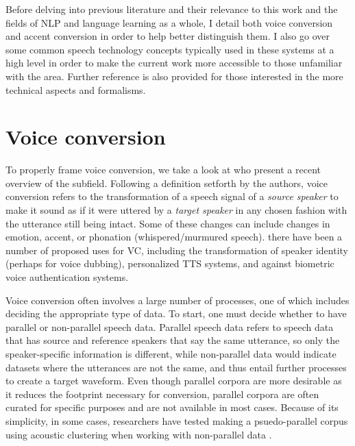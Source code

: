 \documentclass
[
    a4paper,
    twoside,
    12pt,
]
{report}
\begin{document}
Before delving into previous literature and their relevance to this work
and the fields of NLP and language learning as a whole, I detail both
voice conversion and accent conversion in order to help better
distinguish them. I also go over some common speech technology concepts
typically used in these systems at a high level in order to make the
current work more accessible to those unfamiliar with the area. Further
reference is also provided for those interested in the more technical
aspects and formalisms.

\hypertarget{voice-conversion}{%
\section{Voice conversion}\label{voice-conversion}}

To properly frame voice conversion, we take a look at
\textcite{mohammadi2017} who present a recent overview of the subfield.
Following a definition setforth by the authors, voice conversion refers
to the transformation of a speech signal of a \emph{source speaker} to
make it sound as if it were uttered by a \emph{target speaker} in any
chosen fashion with the utterance still being intact. Some of these
changes can include changes in emotion, accent, or phonation
(whispered/murmured speech). there have been a number of proposed uses
for VC, including the transformation of speaker identity (perhaps for
voice dubbing), personalized TTS systems, and against biometric voice
authentication systems.

Voice conversion often involves a large number of processes, one of
which includes deciding the appropriate type of data. To start, one must
decide whether to have parallel or non-parallel speech data. Parallel
speech data refers to speech data that has source and reference speakers
that say the same utterance, so only the speaker-specific information is
different, while non-parallel data would indicate datasets where the
utterances are not the same, and thus entail further processes to create
a target waveform. Even though parallel corpora are more desirable as it
reduces the footprint necessary for conversion, parallel corpora are
often curated for specific purposes and are not available in most cases.
Because of its simplicity, in some cases, researchers have tested making
a psuedo-parallel corpus using acoustic clustering when working with
non-parallel data \parencite{lorenzo-trueba2018, sundermann2006}.
\end{document}
